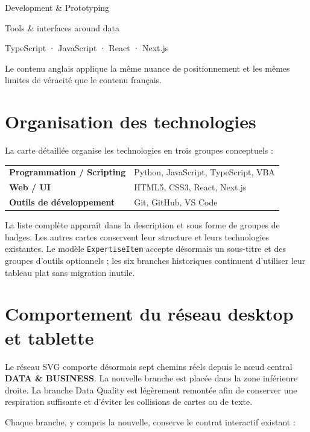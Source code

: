 \documentclass[11pt,a4paper]{article}
\newcommand{\tech}[1]{\texttt{#1}}
\begin{document}
\begin{description}[leftmargin=3.3cm,style=nextline]
  \item[Title] Development \& Prototyping
  \item[Subtitle] Tools \& interfaces around data
  \item[Compact selection] TypeScript · JavaScript · React · Next.js
\end{description}

Le contenu anglais applique la même nuance de positionnement et les mêmes limites de
véracité que le contenu français.

\section{Organisation des technologies}

La carte détaillée organise les technologies en trois groupes conceptuels :

\begin{tabularx}{\textwidth}{>{\bfseries}p{}X}
  Programmation / Scripting & Python, JavaScript, TypeScript, VBA \\
  Web / UI & HTML5, CSS3, React, Next.js \\
  Outils de développement & Git, GitHub, VS Code \\
\end{tabularx}

La liste complète apparaît dans la description et sous forme de groupes de badges. Les autres
cartes conservent leur structure et leurs technologies existantes. Le modèle
\tech{ExpertiseItem} accepte désormais un sous-titre et des groupes d'outils optionnels ; les
six branches historiques continuent d'utiliser leur tableau plat sans migration inutile.

\section{Comportement du réseau desktop et tablette}

Le réseau SVG comporte désormais sept chemins réels depuis le nœud central
\textbf{DATA \& BUSINESS}. La nouvelle branche est placée dans la zone inférieure droite. La
branche Data Quality est légèrement remontée afin de conserver une respiration suffisante et
d'éviter les collisions de cartes ou de texte.

Chaque branche, y compris la nouvelle, conserve le contrat interactif existant :
\end{document}
